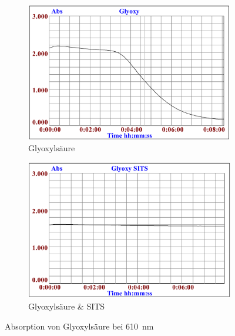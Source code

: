 \documentclass[a4paper,german]{scrreprt}
\begin{document}
\begin{figure}
	\centering
	\begin{subfigure}{.5\textwidth}
		\centering
		\includegraphics[width=\linewidth]{img/haem_glyoxy.png}
		\caption{Glyoxylsäure}
	\end{subfigure}%
	\begin{subfigure}{.5\textwidth}
		\centering
		\includegraphics[width=\linewidth]{img/haem_glyoxy_sits.png}
		\caption{Glyoxylsäure \& SITS}
	\end{subfigure}
	\caption{Absorption von Glyoxylsäure bei \SI{610}{nm}}
	\label{fig:haem_glyoxy}
\end{figure}
\end{document}
